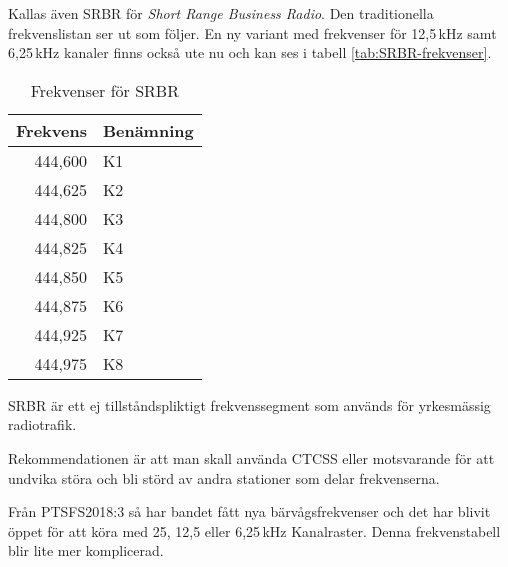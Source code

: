 Kallas även SRBR för {\it Short Range Business Radio}.  Den traditionella
frekvenslistan ser ut som följer. En ny variant med frekvenser för 12,5\,kHz
samt 6,25\,kHz kanaler finns också ute nu och kan ses i tabell
\ref{tab:SRBR-frekvenser}.

\begin{table}[h]
	\centering
\begin{tabular}{rl}
	\textbf{Frekvens} & \textbf{Benämning} \\ \hline
	          444,600 & K1                 \\    
	          444,625 & K2                 \\  
	          444,800 & K3                 \\
	          444,825 & K4                 \\
	          444,850 & K5                 \\
	          444,875 & K6                 \\
	          444,925 & K7                 \\
	          444,975 & K8                 \\
\end{tabular}
\caption{Frekvenser för SRBR}
\end{table}

SRBR är ett ej tillståndspliktigt frekvenssegment som används för
yrkesmässig radiotrafik.

Rekommendationen är att man skall använda CTCSS eller motsvarande för
att undvika störa och bli störd av andra stationer som delar
frekvenserna.

Från PTSFS2018:3 så har bandet fått nya bärvågsfrekvenser och det har
blivit öppet för att köra med 25, 12,5 eller 6,25\,kHz
Kanalraster. Denna frekvenstabell blir lite mer komplicerad.

